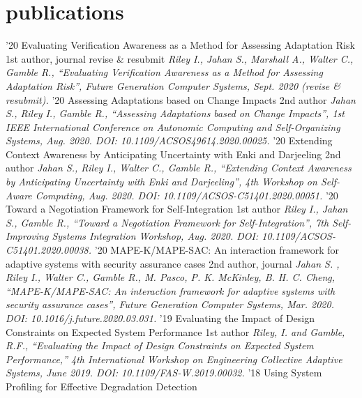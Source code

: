 \documentclass[print]{friggeri-cv}
\begin{document}
  \pagebreak

  \section{publications}

    \begin{entrylist}
      \entry
        {'20}
        {Evaluating Verification Awareness as a Method for Assessing Adaptation Risk}
        {1st author, journal revise \& resubmit}
        {\textit{Riley I., Jahan S., Marshall A., Walter C., Gamble R., “Evaluating Verification Awareness as a Method for Assessing Adaptation Risk”, Future Generation Computer Systems, Sept. 2020 (revise \& resubmit).}}
      \entry
        {'20}
        {Assessing Adaptations based on Change Impacts}
        {2nd author}
        {\textit{Jahan S., Riley I., Gamble R., “Assessing Adaptations based on Change Impacts”, 1st IEEE International Conference on Autonomic Computing and Self-Organizing Systems, Aug. 2020. DOI: 10.1109/ACSOS49614.2020.00025.}}
      \entry
        {'20}
        {Extending Context Awareness by Anticipating Uncertainty with Enki and Darjeeling}
        {2nd author}
        {\textit{Jahan S., Riley I., Walter C., Gamble R., “Extending Context Awareness by Anticipating Uncertainty with Enki and Darjeeling”,  4th Workshop on Self-Aware Computing, Aug. 2020. DOI: 10.1109/ACSOS-C51401.2020.00051.}}
      \entry
        {'20}
        {Toward a Negotiation Framework for Self-Integration}
        {1st author}
        {\textit{Riley I., Jahan S., Gamble R., “Toward a Negotiation Framework for Self-Integration”, 7th Self-Improving Systems Integration Workshop, Aug. 2020. DOI: 10.1109/ACSOS-C51401.2020.00038.}}
      \entry
        {'20}
        {MAPE-K/MAPE-SAC: An interaction framework for adaptive systems with security assurance cases}
        {2nd author, journal}
        {\textit{Jahan S. , Riley I., Walter C., Gamble R., M. Pasco, P. K. McKinley, B. H. C. Cheng, “MAPE-K/MAPE-SAC: An interaction framework for adaptive systems with security assurance cases”, Future Generation Computer Systems, Mar. 2020. DOI: 10.1016/j.future.2020.03.031.}}
      \entry
        {'19}
        {Evaluating the Impact of Design Constraints on Expected System Performance}
        {1st author}
        {\textit{Riley, I. and Gamble, R.F., “Evaluating the Impact of Design Constraints on Expected System Performance,” 4th International Workshop on Engineering Collective Adaptive Systems, June 2019. DOI: 10.1109/FAS-W.2019.00032.}}
      \entry
        {'18}
        {Using System Profiling for Effective Degradation Detection}

\end{entrylist}
\end{document}
